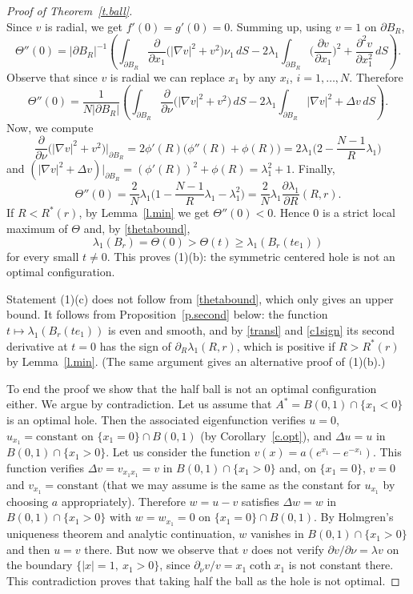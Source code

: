 \documentclass[11pt]{amsart}
\theoremstyle{remark}
\numberwithin{equation}{section}
\begin{document}
\begin{proof}[Proof of Theorem~\ref{t.ball}]
\[\]
Since $v$ is radial, we get $f'(0)=g'(0)=0$. Summing up, using $v=1$ on $\partial B_R$,
\[
\Theta''(0)=|\partial B_R|^{-1}\left(\int_{\partial B_R}\frac{\partial}{\partial x_1}\big(|\nabla v|^2+v^2\big)\nu_1\,dS-2\lambda_1\int_{\partial B_R}\Big(\frac{\partial v}{\partial x_1}\Big)^2+\frac{\partial^2v}{\partial x_1^2}\,dS\right).
\]
Observe that since $v$ is radial we can replace $x_1$ by any $x_i$, $i=1,\dots,N$. Therefore
\[
\Theta''(0)=\frac1{N|\partial B_R|}\left(\int_{\partial B_R}\frac{\partial}{\partial\nu}\big(|\nabla v|^2+v^2\big)\,dS-2\lambda_1\int_{\partial B_R}|\nabla v|^2+\Delta v\,dS\right).
\]
Now, we compute
\[
\frac{\partial}{\partial\nu}\big(|\nabla v|^2+v^2\big)\Big|_{\partial B_R}=2\phi'(R)\big(\phi''(R)+\phi(R)\big)=2\lambda_1\Big(2-\frac{N-1}R\lambda_1\Big)
\]
and $(|\nabla v|^2+\Delta v)|_{\partial B_R}=(\phi'(R))^2+\phi(R)=\lambda_1^2+1$. Finally,
\begin{equation}\label{theta2}
\Theta''(0)=\frac2N\lambda_1\Big(1-\frac{N-1}R\lambda_1-\lambda_1^2\Big)=\frac2N\lambda_1\frac{\partial\lambda_1}{\partial R}(R,r).
\end{equation}
If $R<R^*(r)$, by Lemma~\ref{l.min} we get $\Theta''(0)<0$. Hence $0$ is a strict local maximum of $\Theta$ and, by \eqref{thetabound},
\[
\lambda_1(B_r)=\Theta(0)>\Theta(t)\ge\lambda_1(B_r(te_1))
\]
for every small $t\neq0$. This proves (1)(b): the symmetric centered hole is not an optimal configuration.

Statement (1)(c) does not follow from \eqref{thetabound}, which only gives an upper bound. It follows from Proposition~\ref{p.second} below: the function $t\mapsto\lambda_1(B_r(te_1))$ is even and smooth, and by \eqref{transl} and \eqref{c1sign} its second derivative at $t=0$ has the sign of $\partial_R\lambda_1(R,r)$, which is positive if $R>R^*(r)$ by Lemma~\ref{l.min}. (The same argument gives an alternative proof of (1)(b).)

To end the proof we show that the half ball is not an optimal configuration either. We argue by contradiction. Let us assume that $A^*=B(0,1)\cap\{x_1<0\}$ is an optimal hole. Then the associated eigenfunction verifies $u=0$, $u_{x_1}=\text{constant}$ on $\{x_1=0\}\cap B(0,1)$ (by Corollary~\ref{c.opt}), and $\Delta u=u$ in $B(0,1)\cap\{x_1>0\}$. Let us consider the function $v(x)=a(e^{x_1}-e^{-x_1})$. This function verifies $\Delta v=v_{x_1x_1}=v$ in $B(0,1)\cap\{x_1>0\}$ and, on $\{x_1=0\}$, $v=0$ and $v_{x_1}=\text{constant}$ (that we may assume is the same as the constant for $u_{x_1}$ by choosing $a$ appropriately). Therefore $w=u-v$ satisfies $\Delta w=w$ in $B(0,1)\cap\{x_1>0\}$ with $w=w_{x_1}=0$ on $\{x_1=0\}\cap B(0,1)$. By Holmgren's uniqueness theorem and analytic continuation, $w$ vanishes in $B(0,1)\cap\{x_1>0\}$ and then $u=v$ there. But now we observe that $v$ does not verify $\partial v/\partial\nu=\lambda v$ on the boundary $\{|x|=1,\ x_1>0\}$, since $\partial_\nu v/v=x_1\coth x_1$ is not constant there. This contradiction proves that taking half the ball as the hole is not optimal.
\end{proof}
\end{document}
